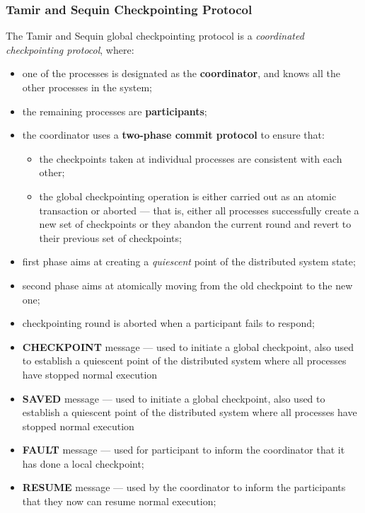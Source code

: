 \documentclass[11pt, a4paper]{article}
\begin{document}
\subsubsection{Tamir and Sequin Checkpointing Protocol}\label{sec:tamir_and_sequin_checkpointing_protocol} %
The Tamir and Sequin global checkpointing protocol is a \textit{coordinated checkpointing protocol}, where:
\begin{itemize}
    \item one of the processes is designated as the \textbf{coordinator}, and knows all the other processes in the system;
    \item the remaining processes are \textbf{participants};
    \item the coordinator uses a \textbf{two-phase commit protocol} to ensure that:
    \begin{itemize}
        \item the checkpoints taken at individual processes are consistent with each other;
        \item the global checkpointing operation is either carried out as an atomic transaction or aborted --- that is, either all processes successfully create a new set of checkpoints or they abandon the current round and revert to their previous set of checkpoints;
    \end{itemize}
    \item first phase aims at creating a \textit{quiescent} point of the distributed system state;
    \item second phase aims at atomically moving from the old checkpoint to the new one;
    \item checkpointing round is aborted when a participant fails to respond;
\end{itemize}
\begin{note}{}
    \begin{itemize}
        \item \textbf{CHECKPOINT} message --- used to initiate a global checkpoint, also used to establish a quiescent point of the distributed system where all processes have stopped normal execution
        \item \textbf{SAVED} message --- used to initiate a global checkpoint, also used to establish a quiescent point of the distributed system where all processes have stopped normal execution
        \item \textbf{FAULT} message --- used for participant to inform the coordinator that it has done a local checkpoint;
        \item \textbf{RESUME} message --- used by the coordinator to inform the participants that they now can resume normal execution;
    \end{itemize}
\end{note}
\end{document}
